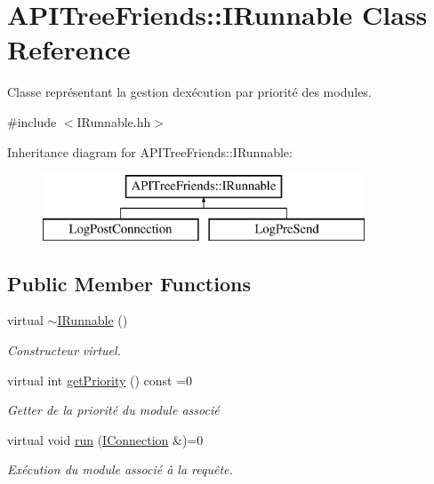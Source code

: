 \hypertarget{class_a_p_i_tree_friends_1_1_i_runnable}{}\section{A\+P\+I\+Tree\+Friends\+:\+:I\+Runnable Class Reference}
\label{class_a_p_i_tree_friends_1_1_i_runnable}


Classe représentant la gestion d\textquotesingle{}exécution par priorité des modules.  




{\ttfamily \#include $<$I\+Runnable.\+hh$>$}

Inheritance diagram for A\+P\+I\+Tree\+Friends\+:\+:I\+Runnable\+:\begin{figure}[H]
\begin{center}
\leavevmode
\includegraphics[height=2.000000cm]{class_a_p_i_tree_friends_1_1_i_runnable}
\end{center}
\end{figure}
\subsection*{Public Member Functions}
\begin{DoxyCompactItemize}
\item 
\hypertarget{class_a_p_i_tree_friends_1_1_i_runnable_a7eceec6f7111a22eff546bca302b7847}{}virtual \hyperlink{class_a_p_i_tree_friends_1_1_i_runnable_a7eceec6f7111a22eff546bca302b7847}{$\sim$\+I\+Runnable} ()\label{class_a_p_i_tree_friends_1_1_i_runnable_a7eceec6f7111a22eff546bca302b7847}

\begin{DoxyCompactList}\small\item\em Constructeur virtuel. \end{DoxyCompactList}\item 
virtual int \hyperlink{class_a_p_i_tree_friends_1_1_i_runnable_aeb9109b9073b2514f22ff0d8feac144b}{get\+Priority} () const =0
\begin{DoxyCompactList}\small\item\em Getter de la priorité du module associé \end{DoxyCompactList}\item 
virtual void \hyperlink{class_a_p_i_tree_friends_1_1_i_runnable_a2a8f99d07563ad7a66f30df4fb996f82}{run} (\hyperlink{class_a_p_i_tree_friends_1_1_i_connection}{I\+Connection} \&)=0
\begin{DoxyCompactList}\small\item\em Exécution du module associé à la requête. \end{DoxyCompactList}\end{DoxyCompactItemize}


